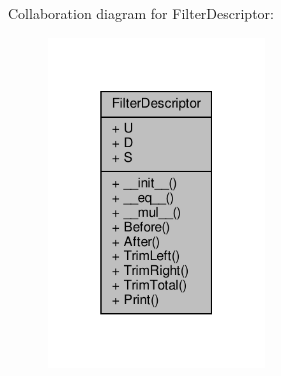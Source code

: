 Collaboration diagram for Filter\+Descriptor\+:
\nopagebreak
\begin{figure}[H]
\begin{center}
\leavevmode
\includegraphics[width=163pt]{classSignalIntegrity_1_1TimeDomain_1_1Filters_1_1FilterDescriptor_1_1FilterDescriptor__coll__graph}
\end{center}
\end{figure}
